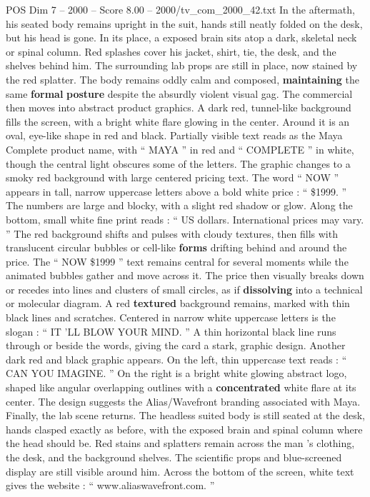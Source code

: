 \begin{textsample}{POS Dim 7 – 2000 – Score 8.00 – 2000/tv\_com\_2000\_42.txt}
In the aftermath, his seated body remains upright in the suit, hands still neatly folded on the desk, but his head is gone.
In its place, a exposed brain sits atop a dark, skeletal neck or spinal column.
Red splashes cover his jacket, shirt, tie, the desk, and the shelves behind him.
The surrounding lab props are still in place, now stained by the red splatter.
The body remains oddly calm and composed, \textbf{maintaining} the same \textbf{formal} \textbf{posture} despite the absurdly violent visual gag.
The commercial then moves into abstract product graphics.
A dark red, tunnel-like background fills the screen, with a bright white flare glowing in the center.
Around it is an oval, eye-like shape in red and black.
Partially visible text reads as the Maya Complete product name, with “ MAYA ” in red and “ COMPLETE ” in white, though the central light obscures some of the letters.
The graphic changes to a smoky red background with large centered pricing text.
The word “ NOW ” appears in tall, narrow uppercase letters above a bold white price : “ \$1999. ” The numbers are large and blocky, with a slight red shadow or glow.
Along the bottom, small white fine print reads : “ US dollars.
International prices may vary. ” The red background shifts and pulses with cloudy textures, then fills with translucent circular bubbles or cell-like \textbf{forms} drifting behind and around the price.
The “ NOW \$1999 ” text remains central for several moments while the animated bubbles gather and move across it.
The price then visually breaks down or recedes into lines and clusters of small circles, as if \textbf{dissolving} into a technical or molecular diagram.
A red \textbf{textured} background remains, marked with thin black lines and scratches.
Centered in narrow white uppercase letters is the slogan : “ IT ’LL BLOW YOUR MIND. ” A thin horizontal black line runs through or beside the words, giving the card a stark, graphic design.
Another dark red and black graphic appears.
On the left, thin uppercase text reads : “ CAN YOU IMAGINE. ” On the right is a bright white glowing abstract logo, shaped like angular overlapping outlines with a \textbf{concentrated} white flare at its center.
The design suggests the Alias/Wavefront branding associated with Maya.
Finally, the lab scene returns.
The headless suited body is still seated at the desk, hands clasped exactly as before, with the exposed brain and spinal column where the head should be.
Red stains and splatters remain across the man ’s clothing, the desk, and the background shelves.
The scientific props and blue-screened display are still visible around him.
Across the bottom of the screen, white text gives the website : “ www.aliaswavefront.com. ”

\end{textsample}
